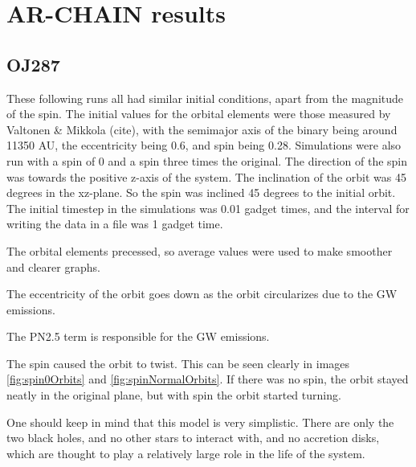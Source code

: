 \documentclass[english, oneside]{HYgradu}
\begin{document}
\chapter{AR-CHAIN results}
\section{OJ287}

These following runs all had similar initial conditions, apart from the magnitude of the spin. The initial values for the orbital elements were those measured by Valtonen \& Mikkola (cite), with the semimajor axis of the binary being around 11350 AU, the eccentricity being 0.6, and spin being 0.28. Simulations were also run with a spin of 0 and a spin three times the original. The direction of the spin was towards the positive z-axis of the system. The inclination of the orbit was 45 degrees in the xz-plane. So the spin was inclined 45 degrees to the initial orbit. The initial timestep in the simulations was 0.01 gadget times, and the interval for writing the data in a file was 1 gadget time. 

The orbital elements precessed, so average values were used to make smoother and clearer graphs. 

The eccentricity of the orbit goes down as the orbit circularizes due to the GW emissions.

The PN2.5 term is responsible for the GW emissions.

The spin caused the orbit to twist. This can be seen clearly in images \ref{fig:spin0Orbits} and \ref{fig:spinNormalOrbits}. If there was no spin, the orbit stayed neatly in the original plane, but with spin the orbit started turning.

One should keep in mind that this model is very simplistic. There are only the two black holes, and no other stars to interact with, and no accretion disks, which are thought to play a relatively large role in the life of the system.
\end{document}
